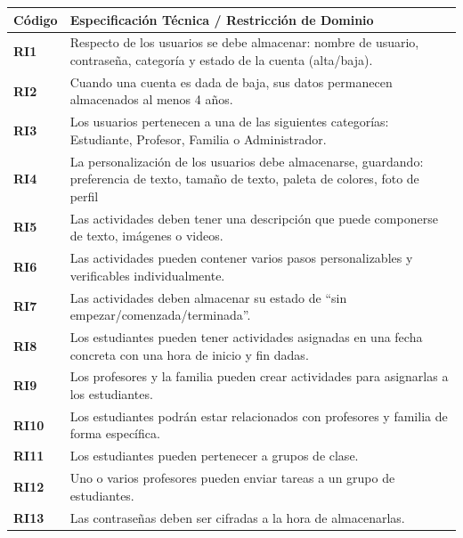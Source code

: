 \begin{table}[H]
\centering
{}
\begin{tabularx}{\textwidth}{|p{2.2cm}|X|}
\hline
\rowcolor{azulPastelApagado}
\textbf{Código} & \textbf{Especificación Técnica / Restricción de Dominio} \\ \hline
\rowcolor{azulclaro}
\textbf{RI1} & Respecto de los usuarios se debe almacenar: nombre de usuario, contraseña, categoría y estado de la cuenta (alta/baja). \\ \hline
\textbf{RI2} & Cuando una cuenta es dada de baja, sus datos permanecen almacenados al menos 4 años. \\ \hline
\rowcolor{azulclaro}
\textbf{RI3} & Los usuarios pertenecen a una de las siguientes categorías: Estudiante, Profesor, Familia o Administrador. \\ \hline
\textbf{RI4} & La personalización de los usuarios debe almacenarse, guardando: preferencia de texto, tamaño de texto, paleta de colores, foto de perfil \\ \hline
\rowcolor{azulclaro}
\textbf{RI5} & Las actividades deben tener una descripción que puede componerse de texto, imágenes o videos. \\ \hline
\textbf{RI6} & Las actividades pueden contener varios pasos personalizables y verificables individualmente. \\ \hline
\rowcolor{azulclaro}
\textbf{RI7} & Las actividades deben almacenar su estado de “sin empezar/comenzada/terminada”. \\ \hline
\textbf{RI8} & Los estudiantes pueden tener actividades asignadas en una fecha concreta con una hora de inicio y fin dadas. \\ \hline
\rowcolor{azulclaro}
\textbf{RI9} & Los profesores y la familia pueden crear actividades para asignarlas a los estudiantes. \\ \hline
\textbf{RI10} & Los estudiantes podrán estar relacionados con profesores y familia de forma específica. \\ \hline
\rowcolor{azulclaro}
\textbf{RI11} & Los estudiantes pueden pertenecer a grupos de clase. \\ \hline
\textbf{RI12} & Uno o varios profesores pueden enviar tareas a un grupo de estudiantes. \\ \hline
\rowcolor{azulclaro}
\textbf{RI13} & Las contraseñas deben ser cifradas a la hora de almacenarlas. \\ \hline
\end{tabularx}
\end{table}

